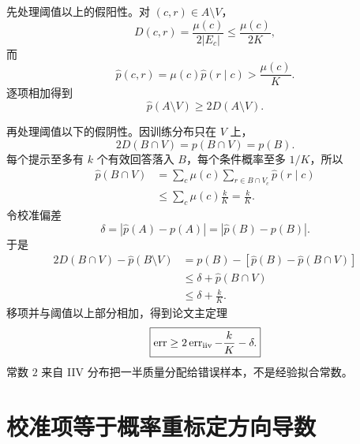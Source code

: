 \documentclass[11pt]{article}
\numberwithin{equation}{section}
\newcommand{\1}{\mathbf{1}}
\begin{document}
先处理阈值以上的假阳性。对 $(c,r)\in A\setminus V$，
\begin{equation}
 D(c,r)=\frac{\mu(c)}{2|E_c|}\le\frac{\mu(c)}{2K},
\end{equation}
而
\begin{equation}
 \widehat p(c,r)=\mu(c)\widehat p(r\mid c)>\frac{\mu(c)}K.
\end{equation}
逐项相加得到
\begin{equation}
 \widehat p(A\setminus V)\ge2D(A\setminus V).
\end{equation}

再处理阈值以下的假阴性。因训练分布只在 $V$ 上，
\begin{equation}
 2D(B\cap V)=p(B\cap V)=p(B).
\end{equation}
每个提示至多有 $k$ 个有效回答落入 $B$，每个条件概率至多 $1/K$，所以
\begin{align}
 \widehat p(B\cap V)
 &=\sum_c\mu(c)\sum_{r\in B\cap V_c}\widehat p(r\mid c)\\
 &\le\sum_c\mu(c)\frac{k}{K}=\frac{k}{K}.
\end{align}
令校准偏差
\begin{equation}
 \delta=|\widehat p(A)-p(A)|=|\widehat p(B)-p(B)|.
\end{equation}
于是
\begin{align}
 2D(B\cap V)-\widehat p(B\setminus V)
 &=p(B)-[\widehat p(B)-\widehat p(B\cap V)]\\
 &\le\delta+\widehat p(B\cap V)\\
 &\le\delta+\frac{k}{K}.
\end{align}
移项并与阈值以上部分相加，得到论文主定理
\begin{equation}
 \boxed{\operatorname{err}
 \ge2\operatorname{err}_{\rm iiv}-\frac{k}{K}-\delta.}
\end{equation}
常数 $2$ 来自 IIV 分布把一半质量分配给错误样本，不是经验拟合常数。

\section{校准项等于概率重标定方向导数}
\end{document}
